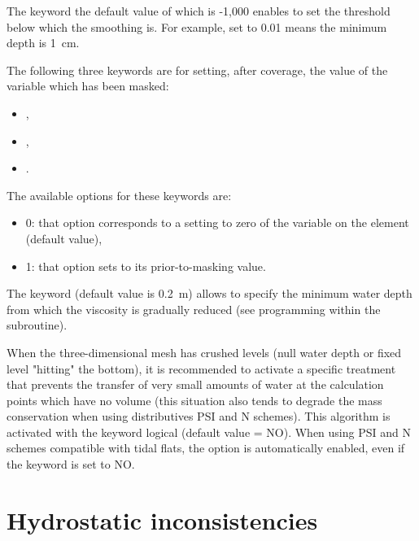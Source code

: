 The keyword  the default value of which is
-1,000 enables to set the threshold below which the smoothing is. For example,
 set to 0.01 means the minimum depth is 1~cm.

The following three keywords are for setting, after coverage, the value of the
variable which has been masked:

\begin{itemize}
\item {},

\item {},

\item {}.
\end{itemize}

The available options for these keywords are:

\begin{itemize}
\item 0: that option corresponds to a setting to zero of the variable on the
element (default value),

\item 1: that option sets to its prior-to-masking value.
\end{itemize}

The keyword  (default
value is 0.2~m) allows to specify the minimum water depth from which the
viscosity is gradually reduced (see programming within the 
subroutine).

When the three-dimensional mesh has crushed levels (null water depth or fixed
level "hitting" the bottom), it is recommended to activate a specific treatment
that prevents the transfer of very small amounts of water at the calculation
points which have no volume (this situation also tends to degrade the mass
conservation when using distributives PSI and N schemes). This algorithm is
activated with the keyword logical 
(default value = NO). When using PSI
and N schemes compatible with tidal flats, the option is automatically enabled,
even if the keyword is set to NO.

\section{Hydrostatic inconsistencies}

